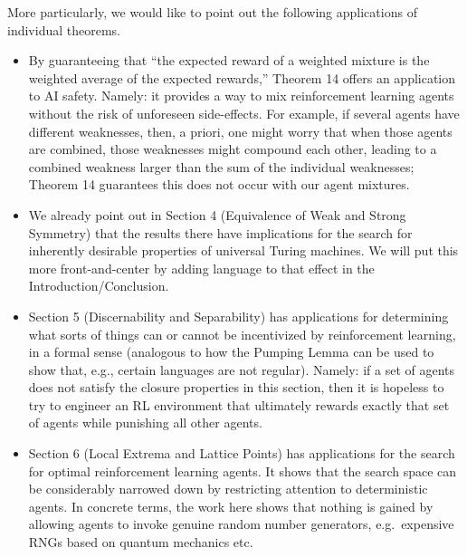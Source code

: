 \documentclass{article}
\begin{document}
More particularly, we would like to point out the following applications of individual theorems.
\begin{itemize}
    \item
    By guaranteeing that ``the expected reward of a weighted mixture is the weighted
    average of the expected rewards,'' Theorem 14 offers an application to AI safety.
    Namely: it provides a way to mix reinforcement learning agents without the risk of
    unforeseen side-effects. For example, if several agents have different weaknesses,
    then, a priori, one might worry that when those agents are combined, those weaknesses
    might compound each other, leading to a combined weakness larger than the sum of the
    individual weaknesses; Theorem 14
    guarantees this does not occur with our agent mixtures.
    \item
    We already point out in Section 4 (Equivalence of Weak and Strong Symmetry)
    that the results there
    have implications for the search for inherently desirable properties of universal Turing
    machines. We will put this more front-and-center by adding language to that effect in the
    Introduction/Conclusion.
    \item
    Section 5 (Discernability and Separability) has applications for determining what
    sorts of things can or cannot be incentivized by reinforcement learning, in a formal sense 
    (analogous to how the Pumping Lemma can be used to show that, e.g., certain
    languages are not regular). Namely: if a set of agents does not satisfy the
    closure properties in this
    section, then it is hopeless to try to engineer an RL environment that ultimately rewards
    exactly that set of agents while punishing all other agents.
    \item
    Section 6 (Local Extrema and Lattice Points) has applications for the search for
    optimal reinforcement learning agents. It shows that the search space can be
    considerably narrowed down by restricting attention to deterministic agents. In concrete
    terms, the work here shows that nothing is gained by allowing agents to invoke
    genuine random number generators, e.g.\ expensive RNGs based on quantum mechanics etc.
\end{itemize}




\end{document}
